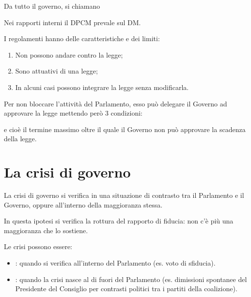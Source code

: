 \documentclass[letterpaper,10pt,italian]{sphinxmanual}
\begin{document}
\sphinxAtStartPar
Da tutto il governo, si chiamano 

\sphinxAtStartPar
Nei rapporti interni il DPCM prevale sul DM.

\sphinxAtStartPar
I regolamenti hanno delle caratteristiche e dei limiti:
\begin{enumerate}
%
\item {} 
\sphinxAtStartPar
Non possono andare contro la legge;

\item {} 
\sphinxAtStartPar
Sono attuativi di una legge;

\item {} 
\sphinxAtStartPar
In alcuni casi possono integrare la legge senza modificarla.

\end{enumerate}

\sphinxAtStartPar
Per non bloccare l’attività del Parlamento, esso può delegare il Governo ad approvare la legge
mettendo però 3 condizioni:

\sphinxAtStartPar
{}

\sphinxAtStartPar
{}

\sphinxAtStartPar
{} e cioè il termine massimo oltre il quale il Governo non può approvare
la scadenza della legge.

\sphinxstepscope


\chapter{La crisi di governo}
\label{\detokenize{LA CRISI DI GOVERNO:la-crisi-di-governo}}\label{\detokenize{LA CRISI DI GOVERNO::doc}}
\sphinxAtStartPar
La crisi di governo si verifica in una situazione di contrasto tra il Parlamento e il Governo, oppure all’interno
della maggioranza stessa.

\sphinxAtStartPar
In questa ipotesi si verifica la rottura del rapporto di fiducia: non c’è più una maggioranza che lo sostiene.

\sphinxAtStartPar
Le crisi possono essere:
\begin{itemize}
\item {} 
\sphinxAtStartPar
{}: quando si verifica all’interno del Parlamento (es. voto di sfiducia).

\item {} 
\sphinxAtStartPar
{}: quando la crisi nasce al di fuori del Parlamento (es. dimissioni spontanee del Presidente del Consiglio per contrasti politici tra i partiti della coalizione).

\end{itemize}
\end{document}
